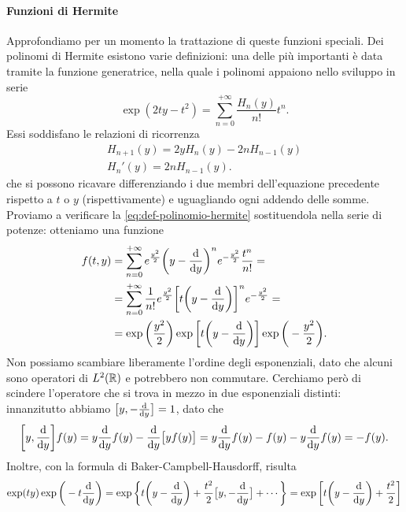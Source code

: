 \paragraph{Funzioni di Hermite}
Approfondiamo per un momento la trattazione di queste funzioni speciali.
Dei polinomi di Hermite esistono varie definizioni: una delle più importanti è data tramite la funzione generatrice, nella quale i polinomi appaiono nello sviluppo in serie
\begin{equation}
	\exp(2ty-t^2)=\sum_{n=0}^{+\infty}\frac{H_n(y)}{n!}t^n.
	\label{eq:funzione-generatrice-polinomi-hermite}
\end{equation}
Essi soddisfano le relazioni di ricorrenza
\begin{equation}
	\begin{gathered}
		H_{n+1}(y)=2yH_n(y)-2nH_{n-1}(y)\\
		H_n'(y)=2nH_{n-1}(y).
	\end{gathered}
	\label{eq:ricorrenza-polinomi-hermite}
\end{equation}
che si possono ricavare differenziando i due membri dell'equazione precedente rispetto a $t$ o $y$ (rispettivamente) e uguagliando ogni addendo delle somme.
Proviamo a verificare la \eqref{eq:def-polinomio-hermite} sostituendola nella serie di potenze: otteniamo una funzione
\begin{equation}
	\begin{split}
		f(t,y)&=\sum_{n=0}^{+\infty}e^{\frac{y^2}2}\bigg(y-\drv{}{y}\bigg)^ne^{-\frac{y^2}2}\frac{t^n}{n!}=\\
		&=\sum_{n=0}^{+\infty}\frac1{n!}e^{\frac{y^2}2}\bigg[t\bigg(y-\drv{}{y}\bigg)\bigg]^ne^{-\frac{y^2}2}=\\
		&=\exp\bigg(\frac{y^2}2\bigg)\exp\bigg[t\bigg(y-\drv{}{y}\bigg)\bigg]\exp\bigg(-\frac{y^2}2\bigg).
	\end{split}
\end{equation}
Non possiamo scambiare liberamente l'ordine degli esponenziali, dato che alcuni sono operatori di $\leb[2]{\R}$ e potrebbero non commutare.
Cerchiamo però di scindere l'operatore che si trova in mezzo in due esponenziali distinti: innanzitutto abbiamo $\big[y,-\drv{}{y}\big]=1$, dato che
\begin{equation}
	\bigg[y,\drv{}{y}\bigg]f(y)=y\drv{}{y}f(y)-\drv{}{y}\big[yf(y)\big]=y\drv{}{y}f(y)-f(y)-y\drv{}{y}f(y)=-f(y).
\end{equation}
Inoltre, con la formula di Baker-Campbell-Hausdorff, risulta
\begin{equation}
	\exp(ty)\exp\bigg(-t\drv{}{y}\bigg)=\exp\bigg\{t\bigg(y-\drv{}{y}\bigg)+\frac{t^2}2\big[y,-\drv{}{y}\big]+\cdots\bigg\}=\exp\bigg[t\bigg(y-\drv{}{y}\bigg)+\frac{t^2}2\bigg]
\end{equation}
